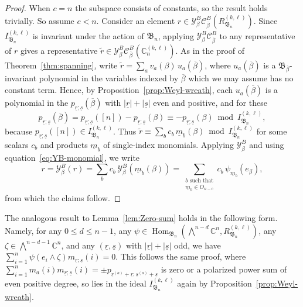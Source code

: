 \documentclass[11pt, reqno]{amsart}
\theoremstyle{definition}
\theoremstyle{remark}
\numberwithin{equation}{section}
\newcommand{\0}{\emptyset}
\newcommand{\C}{\mathbb{C}}
\newcommand{\cC}{\mathcal{C}}
\newcommand{\cY}{\mathcal{Y}}
\newcommand{\m}{\underline{m}}
\renewcommand{\r}{\underline{r}}
\newcommand{\s}{\underline{s}}
\DeclareMathOperator{\Hom}{Hom}
\begin{document}
\begin{proof}
When $c=n$ the subspace consists of constants, so the result holds trivially. So assume $c<n$.
    Consider an element $r \in \cY^B_\beta\cC^B_{\overline{\beta}}\left(R_{\mathfrak{B}_n}^{(k,\ell)}\right)$. 
    Since $I_{\mathfrak{B}_n}^{(k,\ell)}$ is invariant under the action of $\mathfrak{B}_n$, applying $\cY^B_\beta\cC^B_{\overline{\beta}}$ to any representative of $r$ gives a representative $\tilde{r} \in \cY^B_\beta\cC^B_{\overline{\beta}}\left(\C_n^{(k,\ell)}\right)$. 
    As in the proof of Theorem~\ref{thm:spanning}, write $\tilde{r} = \sum_a v_a(\beta)\, u_a(\overline{\beta})$, where $u_a(\overline{\beta})$ is a $\mathfrak{B}_{\overline{\beta}}$-invariant polynomial in the variables indexed by $\overline{\beta}$ which we may assume has no constant term.
    Hence, by Proposition~\ref{prop:Weyl-wreath}, each $u_a(\overline{\beta})$ is a polynomial in the $p_{\r;\s}(\overline{\beta})$ with $|\r| + |\s|$ even and positive, and for these 
    \begin{equation*}
        p_{\r;\s}(\overline{\beta}) = p_{\r;\s}([n]) - p_{\r;\s}({\beta}) \equiv -p_{\r;\s}({\beta}) \bmod I_{\mathfrak{B}_n}^{(k,\ell)},
    \end{equation*}
    because $p_{\r;\s}([n]) \in I_{\mathfrak{B}_n}^{(k,\ell)}$.
    Thus $\tilde{r} \equiv \sum_b c_b\, \m_b(\beta) \bmod{I_{\mathfrak{B}_n}^{(k,\ell)}}$ for some scalars $c_b$ and products $\m_b$ of single-index monomials.
    Applying $\cY^B_\beta$ and using equation~\eqref{eq:YB-monomial}, we write
    \begin{equation*}
        r = \cY^B_\beta(r) = \sum_b c_b\, \cY^B_\beta(\m_b(\beta)) = \sum_{ \substack{ b \text{ such that} \\ \m_b \in O_{n-c}}
        } c_b\, \psi_{\m_b}(e_\beta),
    \end{equation*}
    from which the claims follow. 
\end{proof}

The analogous result to Lemma~\ref{lem:Zero-sum} holds in the following form. Namely, for any $0\leq d \leq n-1$, any $\psi \in \Hom_{\mathfrak{B}_n}\left(\bigwedge^{n-d}\C^n, R_{\mathfrak{B}_n}^{(k,\ell)}\right)$, any $\zeta \in \bigwedge^{n-d-1}\C^n$, and any $(\r,\s)$ with $|\r| + |\s|$ odd, 
    we have $\sum_{i=1}^n \psi(e_i \wedge \zeta) m_{\r;\s}(i) = 0$. 
    This follows the same proof, where $\sum_{i=1}^n m_a(i) m_{\r;\s}(i) = \pm p_{\r^{(a)}+\r; \s^{(a)}+\s}$ is zero or a polarized power sum of even positive degree, so lies in the ideal $I_{\mathfrak{B}_n}^{(k,\ell)}$ again by Proposition~\ref{prop:Weyl-wreath}.
\end{document}
